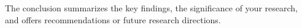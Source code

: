 The conclusion summarizes the key findings, the significance of your research, and offers recommendations or future research directions.